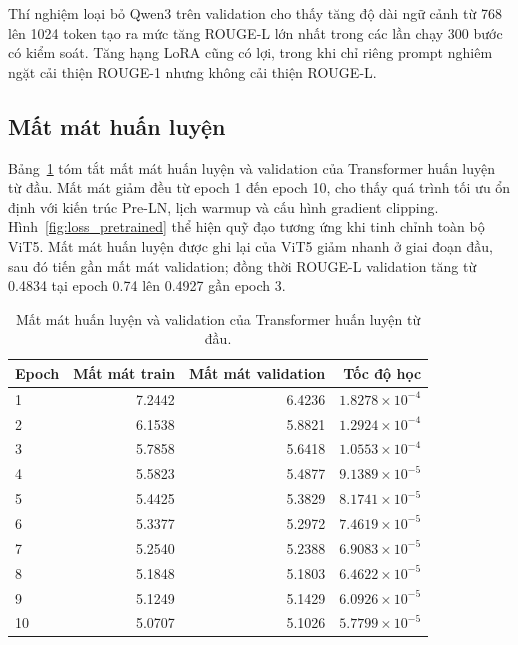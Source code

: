 \documentclass[conference]{IEEEtran}
\begin{document}
Thí nghiệm loại bỏ Qwen3 trên validation cho thấy tăng độ dài ngữ cảnh từ 768 lên 1024 token tạo ra mức tăng ROUGE-L lớn nhất trong các lần chạy 300 bước có kiểm soát. Tăng hạng LoRA cũng có lợi, trong khi chỉ riêng prompt nghiêm ngặt cải thiện ROUGE-1 nhưng không cải thiện ROUGE-L.

\subsection{Mất mát huấn luyện}
Bảng~\ref{tab:loss_scratch} tóm tắt mất mát huấn luyện và validation của Transformer huấn luyện từ đầu. Mất mát giảm đều từ epoch 1 đến epoch 10, cho thấy quá trình tối ưu ổn định với kiến trúc Pre-LN, lịch warmup và cấu hình gradient clipping. Hình~\ref{fig:loss_pretrained} thể hiện quỹ đạo tương ứng khi tinh chỉnh toàn bộ ViT5. Mất mát huấn luyện được ghi lại của ViT5 giảm nhanh ở giai đoạn đầu, sau đó tiến gần mất mát validation; đồng thời ROUGE-L validation tăng từ 0.4834 tại epoch 0.74 lên 0.4927 gần epoch 3.

\begin{table}[htbp]
\centering
\caption{Mất mát huấn luyện và validation của Transformer huấn luyện từ đầu.}
\label{tab:loss_scratch}
\begin{tabular}{lrrr}
\toprule
Epoch & Mất mát train & Mất mát validation & Tốc độ học \\
\midrule
1 & 7.2442 & 6.4236 & $1.8278 \times 10^{-4}$ \\
2 & 6.1538 & 5.8821 & $1.2924 \times 10^{-4}$ \\
3 & 5.7858 & 5.6418 & $1.0553 \times 10^{-4}$ \\
4 & 5.5823 & 5.4877 & $9.1389 \times 10^{-5}$ \\
5 & 5.4425 & 5.3829 & $8.1741 \times 10^{-5}$ \\
6 & 5.3377 & 5.2972 & $7.4619 \times 10^{-5}$ \\
7 & 5.2540 & 5.2388 & $6.9083 \times 10^{-5}$ \\
8 & 5.1848 & 5.1803 & $6.4622 \times 10^{-5}$ \\
9 & 5.1249 & 5.1429 & $6.0926 \times 10^{-5}$ \\
10 & 5.0707 & 5.1026 & $5.7799 \times 10^{-5}$ \\
\bottomrule
\end{tabular}
\end{table}
\end{document}
